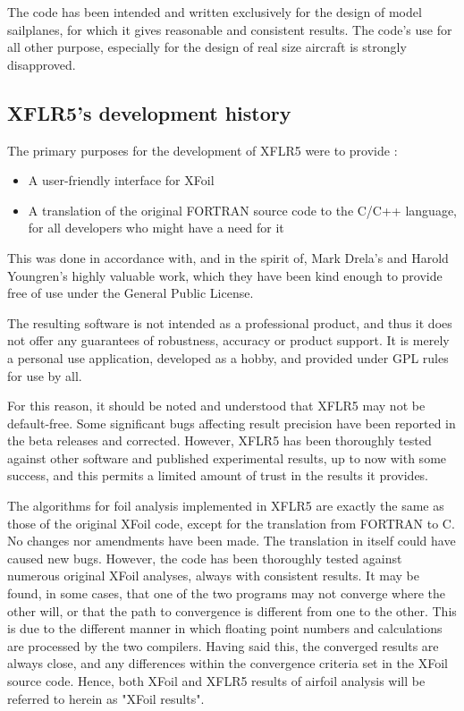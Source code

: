 \documentclass[a4paper,twoside,12pt,dvips]{article}
\begin{document}
The code has been intended and written exclusively for the design of
model sailplanes, for which it gives reasonable and consistent
results.  The code's use for all other purpose, especially for the
design of real size aircraft is strongly disapproved.

\subsection{XFLR5's development history}

The primary purposes for the development of XFLR5 were to provide :

\begin{itemize}
\item A user-friendly interface for XFoil
\item A translation of the original FORTRAN source code to the
C/C++ language, for all developers who might have a need for it
\end{itemize}

This was done in accordance with, and in the spirit of, Mark Drela's
and Harold Youngren's highly valuable work, which they have been kind
enough to provide free of use under the General Public License.

The resulting software is not intended as a professional product, and
thus it does not offer any guarantees of robustness, accuracy or
product support. It is merely a personal use application, developed as
a hobby, and provided under GPL rules for use by all.

For this reason, it should be noted and understood that XFLR5 may not
be default-free. Some significant bugs affecting result precision have
been reported in the beta releases and corrected.\newline
However, XFLR5 has been thoroughly tested against other software and
published experimental results, up to now with some success, and this
permits a limited amount of trust in the results it provides.

The algorithms for foil analysis implemented in XFLR5 are exactly the
same as those of the original XFoil code, except for the translation
from FORTRAN to C. No changes nor amendments have been made. The
translation in itself could have caused new bugs. However, the code
has been thoroughly tested against numerous original XFoil analyses,
always with consistent results. It may be found, in some cases, that
one of the two programs may not converge where the other will, or that
the path to convergence is different from one to the other. This is
due to the different manner in which floating point numbers and
calculations are processed by the two compilers. Having said this, the
converged results are always close, and any differences within the
convergence criteria set in the XFoil source code.\newline
Hence, both XFoil and XFLR5 results of airfoil analysis will be
referred to herein as "XFoil results".
\end{document}
